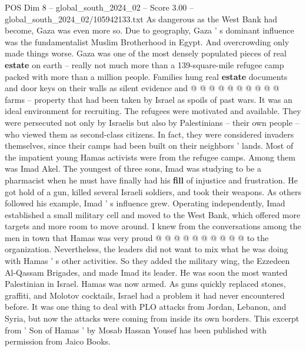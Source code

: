 \begin{textsample}{POS Dim 8 – global\_south\_2024\_02 – Score 3.00 – global\_south\_2024\_02/105942133.txt}
As dangerous as the West Bank had become, Gaza was even more so.
Due to geography, Gaza ' s dominant influence was the fundamentalist Muslim Brotherhood in Egypt.
And overcrowding only made things worse.
Gaza was one of the most densely populated pieces of real \textbf{estate} on earth -- really not much more than a 139-square-mile refugee camp packed with more than a million people.
Families hung real \textbf{estate} documents and door keys on their walls as silent evidence and @ @ @ @ @ @ @ @ @ @ farms -- property that had been taken by Israel as spoils of past wars.
It was an ideal environment for recruiting.
The refugees were motivated and available.
They were persecuted not only by Israelis but also by Palestinians -- their own people -- who viewed them as second-class citizens.
In fact, they were considered invaders themselves, since their camps had been built on their neighbors ' lands.
Most of the impatient young Hamas activists were from the refugee camps.
Among them was Imad Akel.
The youngest of three sons, Imad was studying to be a pharmacist when he must have finally had his \textbf{fill} of injustice and frustration.
He got hold of a gun, killed several Israeli soldiers, and took their weapons.
As others followed his example, Imad ' s influence grew.
Operating independently, Imad established a small military cell and moved to the West Bank, which offered more targets and more room to move around.
I knew from the conversations among the men in town that Hamas was very proud @ @ @ @ @ @ @ @ @ @ to the organization.
Nevertheless, the leaders did not want to mix what he was doing with Hamas ' s other activities.
So they added the military wing, the Ezzedeen Al-Qassam Brigades, and made Imad its leader.
He was soon the most wanted Palestinian in Israel.
Hamas was now armed.
As guns quickly replaced stones, graffiti, and Molotov cocktails, Israel had a problem it had never encountered before.
It was one thing to deal with PLO attacks from Jordan, Lebanon, and Syria, but now the attacks were coming from inside its own borders.
This excerpt from ' Son of Hamas ' by Mosab Hassan Yousef has been published with permission from Jaico Books.

\end{textsample}
